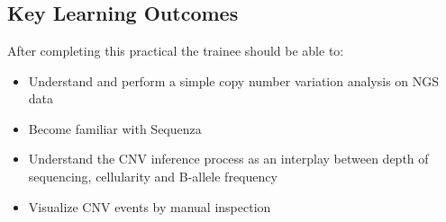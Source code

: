 



\chapter{\moduleTitle}


\newpage


\section{Key Learning Outcomes}

After completing this practical the trainee should be able to:

\begin{itemize}
  \item Understand and perform a simple copy number variation analysis on NGS data
  \item Become familiar with Sequenza
  \item Understand the CNV inference process as an interplay between depth of sequencing, cellularity and B-allele frequency
  \item Visualize CNV events by manual inspection
\end{itemize}

